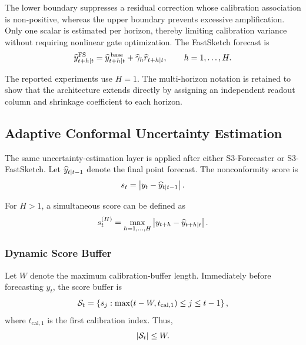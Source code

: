 \documentclass[review,number,sort&compress]{elsarticle}
\begin{document}
The lower boundary suppresses a residual correction whose calibration
association is non-positive, whereas the upper boundary prevents excessive
amplification. Only one scalar is estimated per horizon, thereby limiting
calibration variance without requiring nonlinear gate optimization.
The FastSketch forecast is
\begin{equation}
    \widehat{y}^{\mathrm{FS}}_{t+h|t}
    =
    \widehat{y}^{\,\mathrm{base}}_{t+h|t}
    +
    \widehat{\gamma}_h
    \widehat{r}_{t+h|t},
    \qquad
    h=1,\ldots,H.
    \label{eq:fast_final_forecast}
\end{equation}

The reported experiments use $H=1$. The multi-horizon notation is retained to
show that the architecture extends directly by assigning an independent
readout column and shrinkage coefficient to each horizon.

\subsection{Adaptive Conformal Uncertainty Estimation}
\label{subsec:aci}

The same uncertainty-estimation layer is applied after either S3-Forecaster or
S3-FastSketch. Let $\widehat{y}_{t|t-1}$ denote the final point forecast. The
nonconformity score is
\begin{equation}
    s_t
    =
    \left|
    y_t-\widehat{y}_{t|t-1}
    \right|.
    \label{eq:nonconformity}
\end{equation}

For $H>1$, a simultaneous score can be defined as
\begin{equation}
    s_t^{(H)}
    =
    \max_{h=1,\ldots,H}
    \left|
    y_{t+h}-\widehat{y}_{t+h|t}
    \right|.
\end{equation}

\subsubsection{Dynamic Score Buffer}

Let $W$ denote the maximum calibration-buffer length. Immediately before
forecasting $y_t$, the score buffer is
\begin{equation}
    \mathcal{S}_t
    =
    \left\{
    s_j:
    \max(t-W,t_{\mathrm{cal},1})
    \leq j\leq t-1
    \right\},
    \label{eq:aci_buffer}
\end{equation}
where $t_{\mathrm{cal},1}$ is the first calibration index. Thus,
\begin{equation}
    |\mathcal{S}_t|
    \leq W.
\end{equation}
\end{document}
